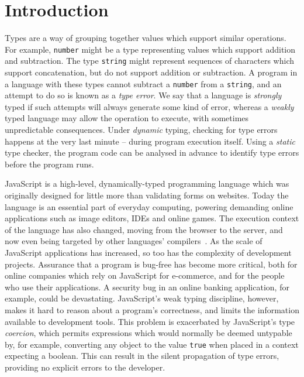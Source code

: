 \documentclass[12pt,a4paper,twoside,openright]{report}
\theoremstyle{definition}
\theoremstyle{dotless}
\newcommand*{\js}{\texttt}
\begin{document}
\chapter{Introduction}\label{introduction}

Types are a way of grouping together values which support similar operations.
For example, \texttt{number} might be a type representing values which support
addition and subtraction. The type \texttt{string} might represent sequences of
characters which support concatenation, but do not support addition or
subtraction. A program in a language with these types cannot subtract a
\texttt{number} from a \texttt{string}, and an attempt to do so is known as a
\textit{type error}. We say that a language is \textit{strongly} typed if such
attempts will always generate some kind of error, whereas a \textit{weakly}
typed language may allow the operation to execute, with sometimes
unpredictable consequences. Under \textit{dynamic} typing, checking for type
errors happens at the very last minute -- during program execution itself.
Using a \textit{static} type checker, the program code can be analysed in
advance to identify type errors before the program runs.

JavaScript is a high-level, dynamically-typed programming language which was
originally designed for little more than validating forms on websites. Today
the language is an essential part of everyday computing, powering demanding
online applications such as image editors, IDEs and online games. The
execution context of the language has also changed, moving from the browser to
the server, and now even being targeted by other languages'
compilers~\cite{asm}. As the scale of JavaScript applications has increased,
so too has the complexity of development projects. Assurance that a program is
bug-free has become more critical, both for online companies which rely on
JavaScript for e-commerce, and for the people who use their applications. A
security bug in an online banking application, for example, could be
devastating. JavaScript's weak typing discipline, however, makes it hard to
reason about a program's correctness, and limits the information available to
development tools. This problem is exacerbated by JavaScript's type
\textit{coercion}, which permits expressions which would normally be deemed
untypable by, for example, converting any object to the value \js{true} when
placed in a context expecting a boolean. This can result in the silent propagation
of type errors, providing no explicit errors to the developer.
\end{document}
